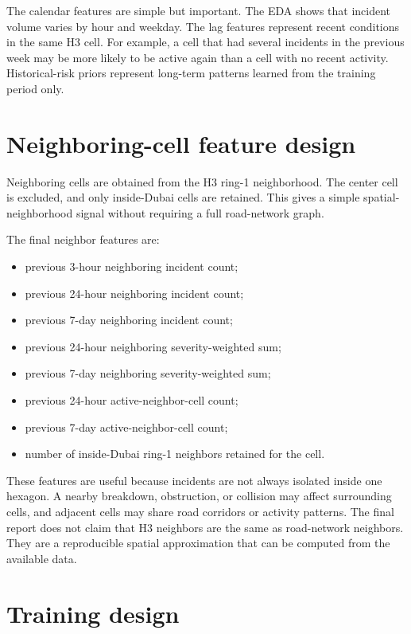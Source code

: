 The calendar features are simple but important. The EDA shows that incident volume varies by hour and weekday. The lag features represent recent conditions in the same H3 cell. For example, a cell that had several incidents in the previous week may be more likely to be active again than a cell with no recent activity. Historical-risk priors represent long-term patterns learned from the training period only.

\section{Neighboring-cell feature design}

Neighboring cells are obtained from the H3 ring-1 neighborhood. The center cell is excluded, and only inside-Dubai cells are retained. This gives a simple spatial-neighborhood signal without requiring a full road-network graph.

The final neighbor features are:

\begin{itemize}
    \item previous 3-hour neighboring incident count;
    \item previous 24-hour neighboring incident count;
    \item previous 7-day neighboring incident count;
    \item previous 24-hour neighboring severity-weighted sum;
    \item previous 7-day neighboring severity-weighted sum;
    \item previous 24-hour active-neighbor-cell count;
    \item previous 7-day active-neighbor-cell count;
    \item number of inside-Dubai ring-1 neighbors retained for the cell.
\end{itemize}

These features are useful because incidents are not always isolated inside one hexagon. A nearby breakdown, obstruction, or collision may affect surrounding cells, and adjacent cells may share road corridors or activity patterns. The final report does not claim that H3 neighbors are the same as road-network neighbors. They are a reproducible spatial approximation that can be computed from the available data.

\section{Training design}

